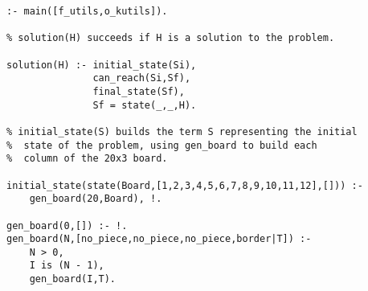 \begin{verbatim}
:- main([f_utils,o_kutils]).

% solution(H) succeeds if H is a solution to the problem.

solution(H) :- initial_state(Si),
               can_reach(Si,Sf),
               final_state(Sf),
               Sf = state(_,_,H).

% initial_state(S) builds the term S representing the initial
%  state of the problem, using gen_board to build each
%  column of the 20x3 board.

initial_state(state(Board,[1,2,3,4,5,6,7,8,9,10,11,12],[])) :-
    gen_board(20,Board), !.

gen_board(0,[]) :- !.
gen_board(N,[no_piece,no_piece,no_piece,border|T]) :-
    N > 0,
    I is (N - 1),
    gen_board(I,T).
\end{verbatim}      %
\pagebreak          %
